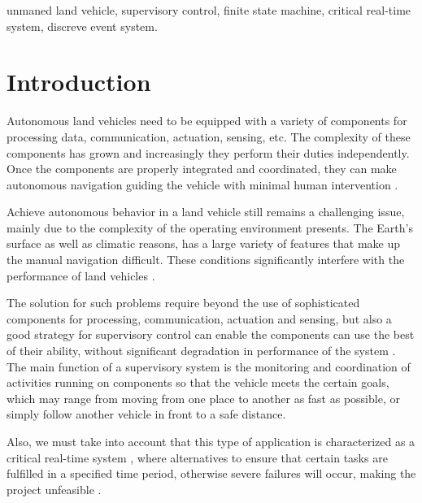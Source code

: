 \documentclass[conference]{IEEEtran}
\begin{document}
\begin{IEEEkeywords}
unmaned land vehicle, supervisory control, finite state machine, critical real-time system, discreve event system.
\end{IEEEkeywords}


\IEEEpeerreviewmaketitle
\section{Introduction}\label{sec:introduction}
Autonomous land vehicles need to be equipped with a variety of components for processing data, communication, actuation, sensing, etc. The complexity of these components has grown and increasingly they perform their duties independently. Once the components are properly integrated and coordinated, they can make autonomous navigation guiding the vehicle with minimal human intervention \cite{autonomous_Hebert:1997:IUG:523961}.

Achieve autonomous behavior in a land vehicle still remains a challenging issue, mainly due to the complexity of the operating environment presents. The Earth's surface as well as climatic reasons, has a large variety of features that make up the manual navigation difficult. These conditions significantly interfere with the performance of land vehicles \cite{supervisory_Donmez:2010:MSE:2377576.2377580}.

The solution for such problems require beyond the use of sophisticated components for processing, communication, actuation and sensing, but also a good strategy for supervisory control can enable the components can use the best of their ability, without significant degradation in performance of the system \cite{supervisory_Cummings_1a}. The main function of a supervisory system is the monitoring and coordination of activities running on components so that the vehicle meets the certain goals, which may range from moving from one place to another as fast as possible, or simply follow another vehicle in front to a safe distance.

Also, we must take into account that this type of application is characterized as a critical real-time system \cite{rtos_safety_mission_4062424}, %
where alternatives to ensure that certain tasks are fulfilled in a specified time period, otherwise severe failures will occur, making the project unfeasible \cite{rtos_nasa_monitors}. %
\end{document}

